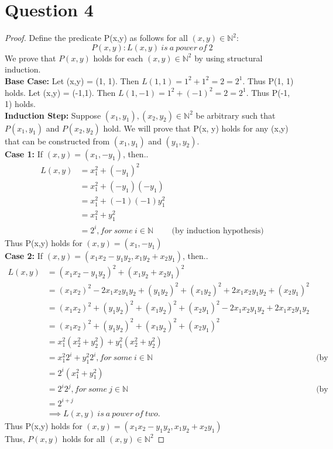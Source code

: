\documentclass[12pt]{article}
\begin{document}
\section*{Question 4}
\begin{proof}
Define the predicate P(x,y) as follows for all $(x,y) \in \mathbb{N}^2$:
$$ P(x,y) : L(x,y) \ is \ a \ power \ of \ 2 $$
We prove that $ P(x,y)$ holds for each $(x,y) \in \mathbb{N}^2$ by using structural induction. \\
\textbf{Base Case:} Let (x,y) = (1, 1). Then $L(1, 1) = 1^2 + 1^2 = 2 = 2^1$. Thus P(1, 1) holds.
Let (x,y) = (-1,1). Then $L(1, -1) = 1^2 + (-1)^2 = 2 =2^1$. Thus P(-1, 1) holds. \\
\textbf{Induction Step:} Suppose $(x_1, y_1), (x_2, y_2) \in \mathbb{N}^2$
be arbitrary such that $P(x_1, y_1)$ and  $P(x_2, y_2)$ hold. We will prove that
P(x, y) holds for any (x,y) that can be constructed from $(x_1, y_1)$ and $(y_1, y_2)$. \\
\indent \textbf{Case 1:} If $(x, y) = (x_1, -y_1)$, then..
\begin{align*}
 L(x, y) & =   x_1^2 + (-y_1)^2  \\
 & =  x_1^2 + (-y_1)(-y_1) \\
 & =  x_1^2 + (-1)(-1)y_1^2 \\
 & =  x_1^2 + y_1^2 \\
 & =  2^i, for \ some \ i \in \mathbb{N} &\text{(by induction hypothesis)}
\end{align*}
Thus P(x,y) holds for $(x,y) = (x_1, -y_1)$ \\
\indent \textbf{Case 2:} If $(x, y) = (x_1x_2 - y_1y_2, x_1y_2 + x_2y_1)$, then..
\begin{align*}
 L(x, y) & =   (x_1x_2 - y_1y_2)^2 + (x_1y_2 + x_2y_1)^2 \\
 & =  (x_1x_2)^2 - 2x_1x_2y_1y_2 + (y_1y_2)^2 + (x_1y_2)^2 + 2x_1x_2y_1y_2 + (x_2y_1)^2\\
 & =  (x_1x_2)^2  + (y_1y_2)^2 + (x_1y_2)^2  + (x_2y_1)^2 - 2x_1x_2y_1y_2 + 2x_1x_2y_1y_2 \\
 & =  (x_1x_2)^2  + (y_1y_2)^2 + (x_1y_2)^2 + (x_2y_1)^2 \\
 & =  x_1^2(x_2^2 + y_2^2) +  y_1^2(x_2^2 + y_2^2) \\
 & =  x_1^2 2^i +  y_1^2 2^i, for \ some \ i \in \mathbb{N}  &\text{(by induction hypothesis)} \\
 & =  2^i(x_1^2 + y_1^2) \\
 & =  2^i 2^j, for \ some \ j \in \mathbb{N} &\text{(by induction hypothesis)} \\
 & =  2^{i+j} \\
 & \implies L(x,y) \ is \ a \ power \ of \ two.
\end{align*}
Thus P(x,y) holds for $(x,y) = (x_1x_2 - y_1y_2, x_1y_2 + x_2y_1)$ \\
Thus, $P(x, y)$ holds for all $(x, y) \in \mathbb{N}^2$
\end{proof}
\end{document}
